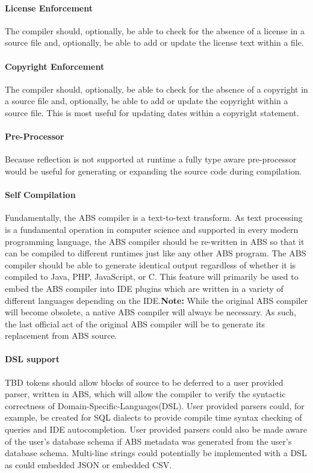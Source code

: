 \documentclass[hidelinks]{article}
\begin{document}
\paragraph{License Enforcement}
The compiler should, optionally, be able to check for the absence of a license in a source file and, optionally, be able to add or update the license text within a file.
\paragraph{Copyright Enforcement}
The compiler should, optionally, be able to check for the absence of a copyright in a source file and, optionally, be able to add or update the copyright within a source file. This is most useful for updating dates within a copyright statement.
\paragraph{Pre-Processor}
Because reflection is not supported at runtime a fully type aware pre-processor would be useful for generating or expanding the source code during compilation.
\paragraph{Self Compilation}
Fundamentally, the ABS compiler is a text-to-text transform. As text processing is a fundamental operation in computer science and supported in every modern programming language, the ABS compiler should be re-written in ABS so that it can be compiled to different runtimes just like any other ABS program. The ABS compiler should be able to generate identical output regardless of whether it is compiled to Java, PHP, JavaScript, or C. This feature will primarily be used to embed the ABS compiler into IDE plugins which are written in a variety of different languages depending on the IDE.\linebreak\linebreak\textbf{Note:} While the original ABS compiler will become obsolete, a native ABS compiler will always be necessary. As such, the last official act of the original ABS compiler will be to generate its replacement from ABS source.
\paragraph{DSL support}
TBD tokens should allow blocks of source to be deferred to a user provided parser, written in ABS, which will allow the compiler to verify the syntactic correctness of Domain-Specific-Languages(DSL). User provided parsers could, for example, be created for SQL dialects to provide compile time syntax checking of queries and IDE autocompletion. User provided parsers could also be made aware of the user's database schema if ABS metadata was generated from the user's database schema. Multi-line strings could potentially be implemented with a DSL as could embedded JSON or embedded CSV.
\end{document}

